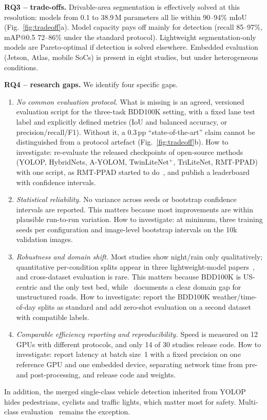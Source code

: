 \documentclass[journal,onecolumn]{IEEEtran}
\begin{document}
\textbf{RQ3 -- trade-offs.} Drivable-area segmentation is effectively solved at this resolution: models from 0.1 to 38.9\,M parameters all lie within 90--94\% mIoU (Fig.~\ref{fig:tradeoff}a). Model capacity pays off mainly for detection (recall 85--97\%, mAP@0.5 72--86\% under the standard protocol). Lightweight segmentation-only models are Pareto-optimal if detection is solved elsewhere. Embedded evaluation (Jetson, Atlas, mobile SoCs) is present in eight studies, but under heterogeneous conditions.

\textbf{RQ4 -- research gaps.} We identify four specific gaps.
\begin{enumerate}
\item \emph{No common evaluation protocol.} What is missing is an agreed, versioned evaluation script for the three-task BDD100K setting, with a fixed lane test label and explicitly defined metrics (IoU and balanced accuracy, or precision/recall/F1). Without it, a 0.3\,pp ``state-of-the-art'' claim cannot be distinguished from a protocol artefact (Fig.~\ref{fig:tradeoff}b). How to investigate: re-evaluate the released checkpoints of open-source methods (YOLOP, HybridNets, A-YOLOM, TwinLiteNet$^+$, TriLiteNet, RMT-PPAD) with one script, as RMT-PPAD started to do~\cite{wang2026rmtppad}, and publish a leaderboard with confidence intervals.
\item \emph{Statistical reliability.} No variance across seeds or bootstrap confidence intervals are reported. This matters because most improvements are within plausible run-to-run variation. How to investigate: at minimum, three training seeds per configuration and image-level bootstrap intervals on the 10k validation images.
\item \emph{Robustness and domain shift.} Most studies show night/rain only qualitatively; quantitative per-condition splits appear in three lightweight-model papers~\cite{che2025twinliteplus,trilitenet2025,twinmixing2026}, and cross-dataset evaluation is rare. This matters because BDD100K is US-centric and the only test bed, while~\cite{selvarajan2026safety} documents a clear domain gap for unstructured roads. How to investigate: report the BDD100K weather/time-of-day splits as standard and add zero-shot evaluation on a second dataset with compatible labels.
\item \emph{Comparable efficiency reporting and reproducibility.} Speed is measured on 12 GPUs with different protocols, and only 14 of 30 studies release code. How to investigate: report latency at batch size~1 with a fixed precision on one reference GPU and one embedded device, separating network time from pre- and post-processing, and release code and weights.
\end{enumerate}
In addition, the merged single-class vehicle detection inherited from YOLOP hides pedestrians, cyclists and traffic lights, which matter most for safety. Multi-class evaluation~\cite{liang2023veprompt} remains the exception.
\end{document}
